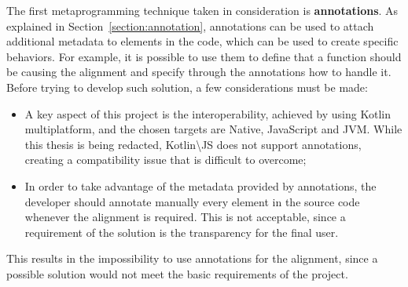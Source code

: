 The first metaprogramming technique taken in consideration is \textbf{annotations}. As explained in Section~\ref{section:annotation}, annotations can be used to attach additional metadata to elements in the code, which can be used to create specific behaviors. For example, it is possible to use them to define that a function should be causing the alignment and specify through the annotations how to handle it.\newline
Before trying to develop such solution, a few considerations must be made:
\begin{itemize}
    \item A key aspect of this project is the interoperability, achieved by using Kotlin multiplatform, and the chosen targets are Native, JavaScript and JVM. While this thesis is being redacted, Kotlin\textbackslash JS does not support annotations, creating a compatibility issue that is difficult to overcome;
    \item In order to take advantage of the metadata provided by annotations, the developer should annotate manually every element in the source code whenever the alignment is required. This is not acceptable, since a requirement of the solution is the transparency for the final user.
\end{itemize}
This results in the impossibility to use annotations for the alignment, since a possible solution would not meet the basic requirements of the project.

